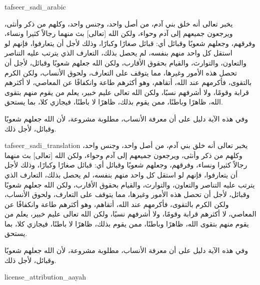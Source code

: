 \begin{taggedblock}{tafseer_sadi_arabic}
\begin{Arabic}
يخبر تعالى أنه خلق بني آدم، من أصل واحد، وجنس واحد، وكلهم من ذكر وأنثى، ويرجعون جميعهم إلى آدم وحواء، ولكن الله
[تعالى]
بث منهما رجالاً كثيرا ونساء، وفرقهم، وجعلهم شعوبًا وقبائل أي: قبائل صغارًا وكبارًا، وذلك لأجل أن يتعارفوا، فإنهم لو استقل كل واحد منهم بنفسه، لم يحصل بذلك، التعارف الذي يترتب عليه التناصر والتعاون، والتوارث، والقيام بحقوق الأقارب، ولكن الله جعلهم شعوبًا وقبائل، لأجل أن تحصل هذه الأمور وغيرها، مما يتوقف على التعارف، ولحوق الأنساب، ولكن الكرم بالتقوى، فأكرمهم عند الله، أتقاهم، وهو أكثرهم طاعة وانكفافًا عن المعاصي، لا أكثرهم قرابة وقومًا، ولا أشرفهم نسبًا، ولكن الله تعالى عليم خبير، يعلم من يقوم منهم بتقوى الله، ظاهرًا وباطنًا، ممن يقوم بذلك، ظاهرًا لا باطنًا، فيجازي كلا، بما يستحق.

وفي هذه الآية دليل على أن معرفة الأنساب، مطلوبة مشروعة، لأن الله جعلهم شعوبًا وقبائل، لأجل ذلك.
\end{Arabic}
\end{taggedblock}
\begin{taggedblock}{tafseer_sadi_translation}
يخبر تعالى أنه خلق بني آدم، من أصل واحد، وجنس واحد، وكلهم من ذكر وأنثى، ويرجعون جميعهم إلى آدم وحواء، ولكن الله
[تعالى]
بث منهما رجالاً كثيرا ونساء، وفرقهم، وجعلهم شعوبًا وقبائل أي: قبائل صغارًا وكبارًا، وذلك لأجل أن يتعارفوا، فإنهم لو استقل كل واحد منهم بنفسه، لم يحصل بذلك، التعارف الذي يترتب عليه التناصر والتعاون، والتوارث، والقيام بحقوق الأقارب، ولكن الله جعلهم شعوبًا وقبائل، لأجل أن تحصل هذه الأمور وغيرها، مما يتوقف على التعارف، ولحوق الأنساب، ولكن الكرم بالتقوى، فأكرمهم عند الله، أتقاهم، وهو أكثرهم طاعة وانكفافًا عن المعاصي، لا أكثرهم قرابة وقومًا، ولا أشرفهم نسبًا، ولكن الله تعالى عليم خبير، يعلم من يقوم منهم بتقوى الله، ظاهرًا وباطنًا، ممن يقوم بذلك، ظاهرًا لا باطنًا، فيجازي كلا، بما يستحق.

وفي هذه الآية دليل على أن معرفة الأنساب، مطلوبة مشروعة، لأن الله جعلهم شعوبًا وقبائل، لأجل ذلك.
\end{taggedblock}
\begin{taggedblock}{license_attribution_aayah}

\end{taggedblock}
\begin{comment}
Please use the following for footnotes:- Sample\footnoteQ{Text of Qur'an footnote goes here.}.
Sample\footnoteT{Text of Tafseer footnote goes here.}.
\end{comment}